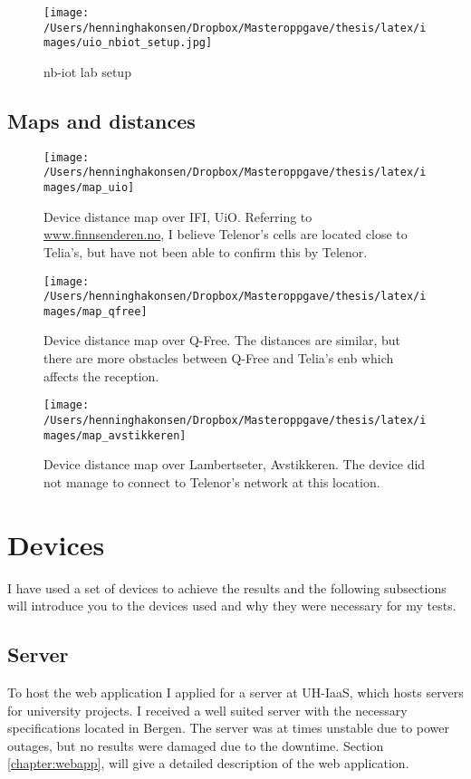 \documentclass[USenglish]{ifimaster}  %
\begin{document}
\begin{figure}[H]
  \centering\texttt{[image: /Users/henninghakonsen/Dropbox/Masteroppgave/thesis/latex/images/uio\_nbiot\_setup.jpg]}
  \caption{\acrshort{nb-iot} lab setup}
  \label{pic:uio_nbiot_setup}
\end{figure}

\subsection{Maps and distances} \label{ssection:mapsndistances}
\begin{figure}[H]
  \centering\texttt{[image: /Users/henninghakonsen/Dropbox/Masteroppgave/thesis/latex/images/map\_uio]}
  \caption[Distance map - IFI, UiO]{Device distance map over IFI, UiO. Referring to \url{www.finnsenderen.no}\cite{online:finnsenderen}, I believe Telenor's cells are located close to Telia's, but have not been able to confirm this by Telenor.}
  \label{figure:map_uio}
\end{figure}

\begin{figure}[H]
  \centering\texttt{[image: /Users/henninghakonsen/Dropbox/Masteroppgave/thesis/latex/images/map\_qfree]}
  \caption[Distance map - Q-Free]{Device distance map over Q-Free. The distances are similar, but there are more obstacles between Q-Free and Telia's \acrshort{enb} which affects the reception.}
  \label{figure:map_qfree}
\end{figure}

\begin{figure}[H]
  \centering\texttt{[image: /Users/henninghakonsen/Dropbox/Masteroppgave/thesis/latex/images/map\_avstikkeren]}
  \caption[Distance map - Lambertseter]{Device distance map over Lambertseter, Avstikkeren. The device did not manage to connect to Telenor's network at this location.}
  \label{figure:map_avstikkeren}
\end{figure}

\section{Devices} \label{ssection:devices}
I have used a set of devices to achieve the results and the following subsections will introduce you to the devices used and why they were necessary for my tests.

\subsection{Server}
To host the web application I applied for a server at UH-IaaS, which hosts servers for university projects. I received a well suited server with the necessary specifications located in Bergen. The server was at times unstable due to power outages, but no results were damaged due to the downtime. Section \vref{chapter:webapp}, will give a detailed description of the web application.
\end{document}
